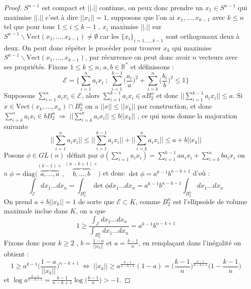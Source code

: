\documentclass[12pt]{article}
\theoremstyle{definition}
\begin{document}
\begin{proof}
	$S^{n-1}$ est compact et $||.||$ continue, on peux donc prendre un $x_1\in S^{n-1}$ qui maximise $||.||$ c'est à dire $||x_1||=1$, supposons que l'on ai $x_1,...,x_{k-1}$ avec $k\leq n$ tel que pour tous $1\leq i\leq k-1$ , $x_i$ maximise $||.||$ sur $S^{n-1}\backslash \text{Vect}(x_1,...,x_{k-1})\neq \emptyset$ car les $\{x_i\}_{i=1,...,k-1}$ sont orthogonaux deux à deux. On peut donc répéter le procéder pour trouver $x_{k}$ qui maximise $S^{n-1}\backslash \text{Vect}(x_1,...,x_{k-1})$, par récurrence on peut donc avoir $n$ vecteurs avec ses propriétés. Fixons $1\leq k \leq n$, $a,b\in\mathbb{R}^{*}$ et définissons :
	\begin{equation*}
	\mathcal{E} = \Big\{\sum_{i=1}^{n}a_ix_i\; ; \; \sum_{i=1}^{k-1}\big(\frac{a_i}{a}\big)^2+ \sum_{i=k}^{n}\big(\frac{b_i}{b}\big)^2\leq 1 \Big\}
	\end{equation*}
	Supposons $\sum_{i=1}^{n}a_ix_i\in \mathcal{E}$, alors $\sum_{i=1}^{k-1}a_ix_i\in aB_2^n$ et donc $||\sum_{i=1}^{k-1}a_ix_i||\leq a$.
	Si $x\in \text{Vect}(x_k,...,x_n)\cap B^n_2$ on a $||x||\leq ||x_k||$ par construction, et donc $\sum_{i=k}^{n}a_ix_i\in bB_2^n \; \Rightarrow \; ||\sum_{i=k}^{n}a_ix_i ||\leq b||x_k||$ , ce qui nous donne la majoration suivante 
	\begin{equation*}
	||\sum_{i=1}^{n}a_ix_i||\leq ||\sum_{i=1}^{k-1}a_ix_i||+||\sum_{i=k}^{n}a_ix_i||\leq a + b||x_k||
	\end{equation*}
	Posons $\phi\in GL(n)$ définit par $\phi(\sum_{i=1}^{n}a_ix_i)=\sum_{i=1}^{k-1}aa_ix_i+\sum_{i=k}^{n}ba_ix_i$ on a $\phi = \text{diag}\big(\overbrace{a,...,a}^{(k-1)\times},\overbrace{b,...,b}^{(n-k+1) \times}\big)$ et donc $\det \phi = a^{k-1}b^{n-k+1}$ d'où :
	\begin{equation*}
	\int_{\mathcal{E}} dx_1...dx_n = \int_{B_2^n} \det \phi dx_1...dx_n= a^{k-1}b^{n-k-1}\int_{B_2^n}dx_1...dx_n
	\end{equation*}
	On prend $a+b||x_k||= 1$ de sorte que $\mathcal{E}\subset K$, comme $B_2^n$ est l'ellipsoïde de volume maximale inclue dans $K$, on a que  
	\begin{equation*}
	1\geq\frac{\int_{\mathcal{E}} dx_1...dx_n}{\int_{B_2^n}dx_1...dx_n}=a^{k-1}b^{n-k+1}
	\end{equation*}
	Fixons donc pour $k\geq 2$ , $b=\frac{1-a}{||x_k||}$ et $a=\frac{k-1}{n}$, en remplaçant dans l'inégalité on obtient :
	\begin{equation*}
	1\geq a^{k-1} \Big(\frac{1-a}{||x_k||}\Big)^{n-k+1} \; \iff \; ||x_k||\geq a^{\frac{k-1}{n-k+1}}(1-a) = \Big(\frac{k-1}{n}\Big)^{\frac{k-1}{n-k+1}}\Big(1-\frac{k-1}{n}\Big)
	\end{equation*}
	et $\log a^{\frac{k-1}{n-k+1}}= \frac{k-1}{n-k+1}\log\Big(\frac{k-1}{n}\Big)>-1$.
	
\end{proof}
\end{document}
